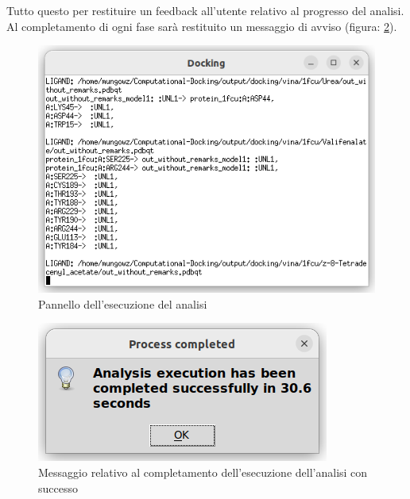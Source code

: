 Tutto questo per restituire un feedback all'utente relativo al progresso del analisi. Al completamento di ogni fase sarà restituito un messaggio di avviso (figura: \ref{fig:progress completed analysis}).

\begin{figure}[H]
    \centering
    \includegraphics[scale=0.8]{immagini/capitolo3/analysisExecution.png}
    \caption{Pannello dell'esecuzione del analisi}
    \label{fig:analysis execution}
\end{figure}

\begin{figure}[H]
    \centering
    \includegraphics{immagini/capitolo3/progressCompletedAnalysis.png}
    \caption{Messaggio relativo al completamento dell'esecuzione dell'analisi con successo}
    \label{fig:progress completed analysis}
\end{figure}